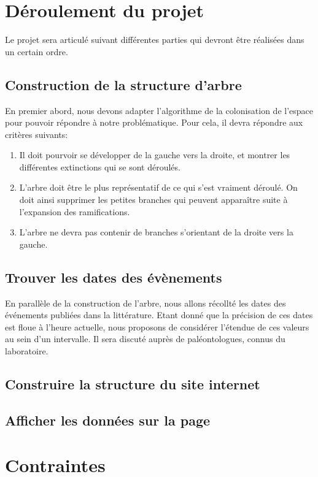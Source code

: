 \documentclass[a4paper]{article}
\begin{document}
{\section{Déroulement du projet}
	Le projet sera articulé suivant différentes parties qui devront être réalisées dans un certain ordre.
			
	\subsection{Construction de la structure d'arbre}
		En premier abord, nous devons adapter l'algorithme de la colonisation de l'espace pour pouvoir répondre à notre problématique. Pour cela, il devra répondre aux critères suivants:
		\begin{enumerate}
			\item Il doit pourvoir se développer de la gauche vers la droite, et montrer les différentes extinctions qui se sont déroulés.
			\item L'arbre doit être le plus représentatif de ce qui s'est vraiment déroulé. On doit ainsi supprimer les petites branches qui peuvent apparaître suite à l'expansion des ramifications.
			\item L'arbre ne devra pas contenir de branches s'orientant de la droite vers la gauche.
		\end{enumerate}
	 
	\subsection{Trouver les dates des évènements}
		En parallèle de la construction de l'arbre, nous allons récollté les dates des événements publiées dans la littérature. Etant donné que la précision de ces dates est floue à l'heure actuelle, nous proposons de considérer l'étendue de ces valeurs au sein d'un intervalle. Il sera discuté auprès de paléontologues, connus du laboratoire.

	\subsection{Construire la structure du site internet}

	\subsection{Afficher les données sur la page}
		

\section{Contraintes}

}
\end{document}
